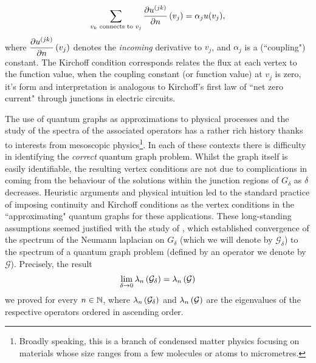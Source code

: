 \begin{align*}
	\sum_{v_k \text{ connects to } v_j} 
	\dfrac{\partial u^{(jk)}}{\partial n}\left( v_j \right) = \alpha_j u(v_j),
\end{align*}
where $\dfrac{\partial u^{(jk)}}{\partial n}\left( v_j \right)$ denotes the \emph{incoming} derivative to $v_j$, and $\alpha_j$ is a (``coupling") constant. 
The Kirchoff condition corresponds relates the flux at each vertex to the function value, when the coupling constant (or function value) at $v_j$ is zero, it's form and interpretation is analogous to Kirchoff's first law of ``net zero current" through junctions in electric circuits.

The use of quantum graphs as approximations to physical processes and the study of the spectra of the associated operators has a rather rich history thanks  to interests from mesoscopic physics\footnote{Broadly speaking, this is a branch of condensed matter physics focusing on materials whose size ranges from a few molecules or atoms to micrometres.}.
In each of these contexts there is difficulty in identifying the \emph{correct} quantum graph problem. Whilst the graph itself is easily identifiable, the resulting vertex conditions are not due to complications in coming from the behaviour of the solutions within the junction regions of $G_{\delta}$ as $\delta$ decreases.
Heuristic arguments and physical intuition led to the standard practice of imposing continuity and Kirchoff conditions as the vertex conditions in the ``approximating" quantum graphs for these applications.
These long-standing assumptions seemed justified with the study of , which established convergence of the spectrum of the Neumann laplacian on $G_{\delta}$ (which we will denote by $\mathcal{G}_{\delta}$) to the spectrum of a quantum graph problem (defined by an operator we denote by $\mathcal{G}$).
Precisely, the result
\begin{align*}
	\lim_{\delta\rightarrow0} \lambda_n\left( \mathcal{G}_{\delta} \right) = \lambda_n\left( \mathcal{G} \right)
\end{align*}
we proved for every $n\in\mathbb{N}$, where $\lambda_n\left( \mathcal{G}_{\delta} \right)$ and $\lambda_n\left( \mathcal{G} \right)$ are the eigenvalues of the respective operators ordered in ascending order.
